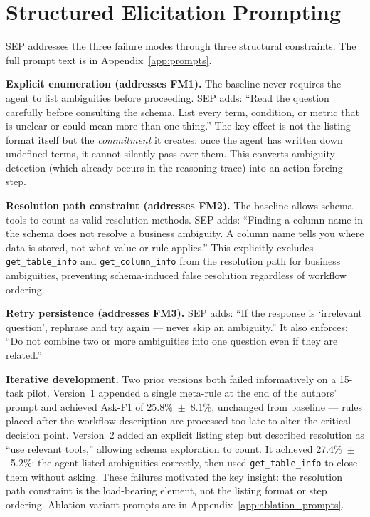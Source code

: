 \documentclass{article} %
\newcommand{\oursystem}{SEP} %
\begin{document}
\section{Structured Elicitation Prompting}
\label{sec:method}

\oursystem{} addresses the three failure modes through three structural constraints.
The full prompt text is in Appendix~\ref{app:prompts}.

\textbf{Explicit enumeration (addresses FM1).}
The baseline never requires the agent to list ambiguities before proceeding.
\oursystem{} adds: ``Read the question carefully before consulting the schema.
List every term, condition, or metric that is unclear or could mean more than one thing.''
The key effect is not the listing format itself but the \emph{commitment} it creates:
once the agent has written down undefined terms, it cannot silently pass over them.
This converts ambiguity detection (which already occurs in the reasoning trace) into
an action-forcing step.

\textbf{Resolution path constraint (addresses FM2).}
The baseline allows schema tools to count as valid resolution methods.
\oursystem{} adds: ``Finding a column name in the schema does not resolve a business
ambiguity. A column name tells you where data is stored, not what value or rule applies.''
This explicitly excludes \texttt{get\_table\_info} and \texttt{get\_column\_info}
from the resolution path for business ambiguities, preventing schema-induced false
resolution regardless of workflow ordering.

\textbf{Retry persistence (addresses FM3).}
\oursystem{} adds: ``If the response is `irrelevant question', rephrase and try again ---
never skip an ambiguity.''
It also enforces: ``Do not combine two or more ambiguities into one question even if
they are related.''

\textbf{Iterative development.}
Two prior versions both failed informatively on a 15-task pilot.
Version~1 appended a single meta-rule at the end of the authors' prompt and achieved
Ask-F1 of 25.8\%~$\pm$~8.1\%, unchanged from baseline --- rules placed after the
workflow description are processed too late to alter the critical decision point.
Version~2 added an explicit listing step but described resolution as ``use relevant
tools,'' allowing schema exploration to count.
It achieved 27.4\%~$\pm$~5.2\%: the agent listed ambiguities correctly, then used
\texttt{get\_table\_info} to close them without asking.
These failures motivated the key insight: the resolution path constraint is the
load-bearing element, not the listing format or step ordering.
Ablation variant prompts are in Appendix~\ref{app:ablation_prompts}.
\end{document}

